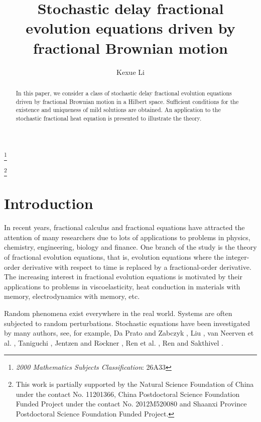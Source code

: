 \documentclass[12pt,a4paper,oneside,reqno,notitlepage]{amsart}
\theoremstyle{plain}
\numberwithin{equation}{section}
\begin{document}
\baselineskip 8mm
\parindent 9mm

\title[]
{Stochastic delay fractional evolution equations driven by fractional Brownian motion}


\author {Kexue Li}


\address{School of Mathematics and Statistics, Xi'an Jiaotong University, Xi'an 710049, China}





\thanks{{\it 2000 Mathematics Subjects Classification}: 26A33}

\thanks{This work is partially supported
by the Natural Science Foundation of China under the contact
No. 11201366, China Postdoctoral Science Foundation Funded Project under the contact No. 2012M520080 and Shaanxi Province Postdoctoral Science Foundation Funded Project.}


\begin{abstract}
In this paper, we consider a class of stochastic delay fractional evolution equations driven by fractional Brownian motion in a Hilbert space. Sufficient conditions for the existence and uniqueness of mild solutions are obtained. An application to the stochastic fractional heat equation is presented to illustrate the theory.
\end{abstract}
\maketitle

\section{\textbf{Introduction}}

In recent years, fractional calculus and fractional  equations  have attracted the attention of many researchers due to lots of applications to problems
in physics, chemistry, engineering, biology and finance. One branch of the study is the theory of fractional evolution equations, that is, evolution equations
where the integer-order derivative with respect to time is replaced by a fractional-order derivative. The increasing interest in fractional evolution equations
is motivated by their applications to problems in viscoelasticity, heat conduction in materials with memory, electrodynamics with memory, etc.

Random phenomena exist everywhere in the real world. Systems are often subjected to random perturbations. Stochastic equations have been investigated
by many authors, see, for example, Da Prato and Zabczyk \cite{Da Prato}, Liu \cite{Liu}, van Neerven et al. \cite{Neerven}, Taniguchi \cite{Taniguchi}, Jentzen and R$\ddot{o}$ckner \cite{Arnulf}, Ren et al. \cite{RB}, Ren and Sakthivel \cite{YR}.
\end{document}
